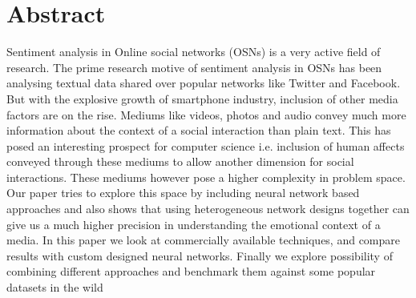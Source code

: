 \section{Abstract}
Sentiment analysis in Online social networks (OSNs) is a very active field of research. The prime research motive of sentiment analysis in OSNs has been analysing textual data shared over popular networks like Twitter and Facebook. But with the explosive growth of smartphone industry, inclusion of other media factors are on the rise. Mediums like videos, photos and audio convey much more information about the context of a social interaction than plain text. This has posed an interesting prospect for computer science i.e. inclusion of human affects conveyed through these mediums to allow another dimension for social interactions. These mediums however pose a higher complexity in problem space. Our paper tries to explore this space by including neural network based approaches and also shows that using heterogeneous network designs together can give us a much higher precision in understanding the emotional context of a media. In this paper we look at commercially available techniques, and compare results with custom designed neural networks. Finally we explore possibility of combining different approaches and benchmark them against some popular datasets in the wild 